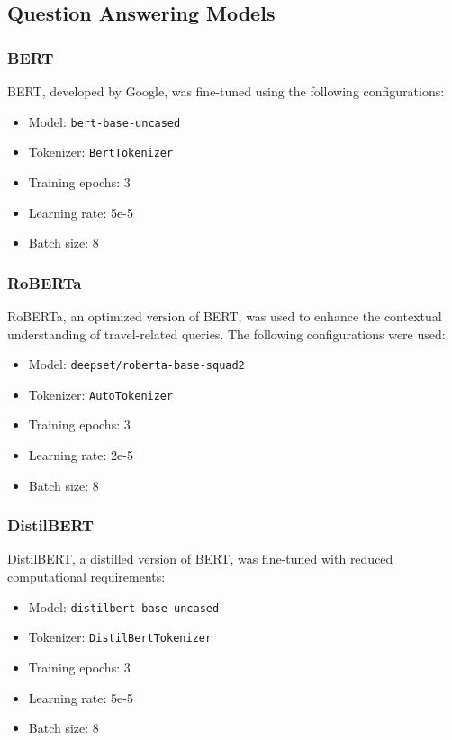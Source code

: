 \documentclass[conference]{IEEEtran}
\begin{document}
    \subsection{Question Answering Models}

        \subsubsection{BERT}

            BERT, developed by Google, was fine-tuned using the following configurations:
            \begin{itemize}
                \item Model: \texttt{bert-base-uncased}
                \item Tokenizer: \texttt{BertTokenizer}
                \item Training epochs: 3
                \item Learning rate: 5e-5
                \item Batch size: 8
            \end{itemize}

        \subsubsection{RoBERTa}

            RoBERTa, an optimized version of BERT, was used to enhance the contextual understanding of travel-related queries. The following configurations were used:
            \begin{itemize}
                \item Model: \texttt{deepset/roberta-base-squad2}
                \item Tokenizer: \texttt{AutoTokenizer}
                \item Training epochs: 3
                \item Learning rate: 2e-5
                \item Batch size: 8
            \end{itemize}

        \subsubsection{DistilBERT}

            DistilBERT, a distilled version of BERT, was fine-tuned with reduced computational requirements:
            \begin{itemize}
                \item Model: \texttt{distilbert-base-uncased}
                \item Tokenizer: \texttt{DistilBertTokenizer}
                \item Training epochs: 3
                \item Learning rate: 5e-5
                \item Batch size: 8
            \end{itemize}
\end{document}
